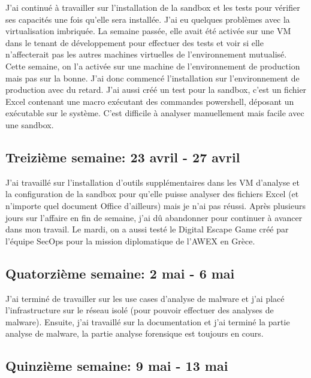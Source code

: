 J'ai continué à travailler sur l'installation de la sandbox et les tests pour vérifier ses capacités une fois qu'elle sera installée. J'ai eu quelques problèmes avec la virtualisation imbriquée. La semaine passée, elle avait été activée sur une VM dans le tenant de développement pour effectuer des tests et voir si elle n'affecterait pas les autres machines virtuelles de l'environnement mutualisé. Cette semaine, on l'a activée sur une machine de l'environnement de production mais pas sur la bonne. J'ai donc commencé l'installation sur l'environnement de production avec du retard. J'ai aussi créé un test pour la sandbox, c'est un fichier Excel contenant une macro exécutant des commandes powershell, déposant un exécutable sur le système. C'est difficile à analyser manuellement mais facile avec une sandbox.



\subsection{Treizième semaine: 23 avril - 27 avril}

J'ai travaillé sur l'installation d'outils supplémentaires dans les VM d'analyse et la configuration de la sandbox pour qu'elle puisse analyser des fichiers Excel (et n'importe quel document Office d'ailleurs) mais je n'ai pas réussi. Après plusieurs jours sur l'affaire en fin de semaine, j'ai dû abandonner pour continuer à avancer dans mon travail. Le mardi, on a aussi testé le Digital Escape Game créé par l'équipe SecOps pour la mission diplomatique de l'AWEX en Grèce.



\subsection{Quatorzième semaine: 2 mai - 6 mai}

J'ai terminé de travailler sur les use cases d'analyse de malware et j'ai placé l'infrastructure sur le réseau isolé (pour pouvoir effectuer des analyses de malware). Ensuite, j'ai travaillé sur la documentation et j'ai terminé la partie analyse de malware, la partie analyse forensique est toujours en cours.



\subsection{Quinzième semaine: 9 mai - 13 mai}

